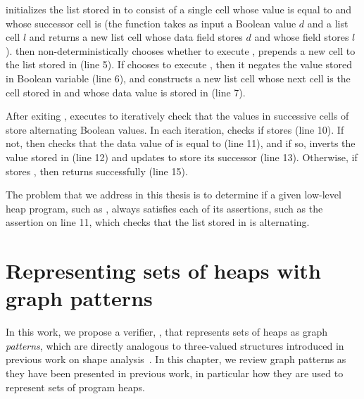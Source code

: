 \altlist initializes the list stored in \lsnm to consist of a single
cell whose value is equal to \datavarnm and whose successor cell is
\nilconst (the function \consls takes as input a Boolean value $d$ and
a list cell $l$ and returns a new list cell whose data field stores
$d$ and whose \nextnm field stores $l$).
%
\altlist then non-deterministically chooses whether to execute
\consloop, prepends a new cell to the list stored in \lsnm (line 5).
%
If \altlist chooses to execute \consloop, then it negates the value
stored in Boolean variable \datanm (line 6), and constructs a new list
cell whose next cell is the cell stored in \lsnm and whose data value
is stored in \datanm (line 7).

After exiting \consloop, \altlist executes \chkloop to iteratively
check that the values in successive cells of \lsnm store alternating
Boolean values.
%
In each iteration, \altlist checks if \lsnm stores \nilconst (line
10).
%
If not, then \altlist checks that the data value of \lsnm is equal to
\datanm (line 11), and if so, inverts the value stored in \datanm
(line 12) and updates \lsnm to store its successor (line 13).
%
Otherwise, if \lsnm stores \nilconst, then \altlist returns
successfully (line 15).

The problem that we address in this thesis is to determine if a given low-level heap program, such as \altlist, always satisfies each of its assertions, such as the assertion on line 11, which checks that the list stored in \lsnm is alternating.

\section{Representing sets of heaps with graph patterns}
\label{sec:ex-patterns}
In this work, we propose a verifier, \verifier, that represents sets of heaps as graph \emph{patterns}, which are directly analogous to three-valued structures introduced in previous work on shape analysis~\cite{sagiv02}.
%
In this chapter, we review graph patterns as they have been presented in previous work, in particular how they are used to represent sets of program heaps.

